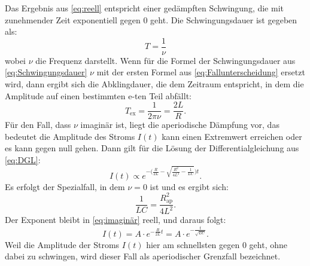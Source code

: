 Das Ergebnis aus \ref{eq:reell} entspricht einer gedämpften Schwingung, die mit zunehmender Zeit exponentiell gegen 0 geht. 
Die Schwingungsdauer ist gegeben als:
\begin{equation}
\label{eq:Schwingungsdauer}
T = \frac{1}{\nu}
\end{equation}
wobei $\nu$ die Frequenz darstellt.
Wenn für die Formel der Schwingungsdauer aus \ref{eq:Schwingungsdauer} $\nu$ mit der ersten Formel aus \ref{eq:Fallunterscheidung} ersetzt wird, dann ergibt sich die Abklingdauer, die dem Zeitraum entspricht, 
in dem die Amplitude auf einen bestimmten e-ten Teil abfällt:
\begin{equation*}
T_{\text{ex}} = \frac{1}{2 \pi \nu} = \frac{2L}{R}.
\label{eq:Abklingdauer}
\end{equation*}
Für den Fall, dass $\nu$ imaginär ist, liegt die aperiodische Dämpfung vor, das bedeutet die Amplitude des Stroms $I(t)$ kann einen Extremwert erreichen oder es kann gegen null gehen. Dann gilt für die Lösung der 
Differentialgleichung aus \ref{eq:DGL}:
\begin{equation}
\label{eq:imaginär}
I(t) \propto e^{-\biggl(\frac{R}{2L}-\sqrt{\frac{R^{2}}{4L^{2}}-\frac{1}{LC}}\biggr)t}.
\end{equation}
Es erfolgt der Spezialfall, in dem $\nu = 0$ ist und es ergibt sich:
\begin{equation}
\frac{1}{LC} = \frac{R_\text{ap}^{2}}{4L^{2}}.
\label{eq:widerstandap}
\end{equation}
Der Exponent bleibt in \ref{eq:imaginär} reell, und daraus folgt:
\begin{equation*}
I(t) = A \cdot e^{-{\frac{R}{2L}t}} = A \cdot e^{-\frac{t}{\sqrt{LC}}}.
\end{equation*}
Weil die Amplitude der Stroms $I(t)$ hier am schnellsten gegen 0 geht, ohne dabei zu schwingen, wird dieser Fall als aperiodischer Grenzfall bezeichnet.

